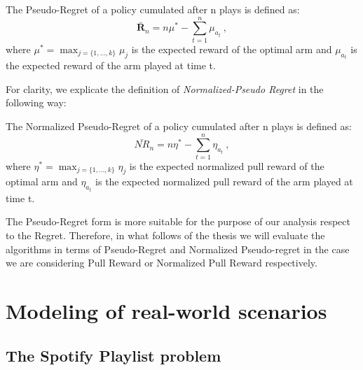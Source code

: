 \begin{definition}
	The Pseudo-Regret of a policy cumulated after n plays is defined as:
		$$\bm\bar{R}_{n}=n{\mu^{*}}- \sum_{t=1}^{n} \mu_{a_t} \ ,$$
	where  $\mu^{*}=\max_{j = \{1,\dots,k\}} \mu_j$ is the expected reward of the optimal arm and $\mu_{a_t}$ is the expected reward of the arm played at time t.
\end{definition}
For clarity, we explicate the definition of \emph{Normalized-Pseudo Regret} in the following way:
\begin{definition}
	The Normalized Pseudo-Regret of a policy cumulated after n plays is defined as:
	$$\bm\bar{\mathit{NR}}_{n}=n{\eta^{*}}- \sum_{t=1}^{n} \eta_{a_t} \ , $$
	where  $\eta^{*}=\max_{j = \{1,\dots,k\}} \eta_j$ is the expected normalized pull reward of the optimal arm and $\eta_{a_t}$ is the expected normalized pull reward of the arm played at time t.
\end{definition}



The Pseudo-Regret form is more suitable for the purpose of our analysis respect to the Regret. Therefore, in what follows of the thesis we will evaluate the algorithms in terms of Pseudo-Regret and Normalized Pseudo-regret in the case we are considering Pull Reward or Normalized Pull Reward respectively.



\section{Modeling of real-world scenarios}
\subsection{The Spotify Playlist problem}


